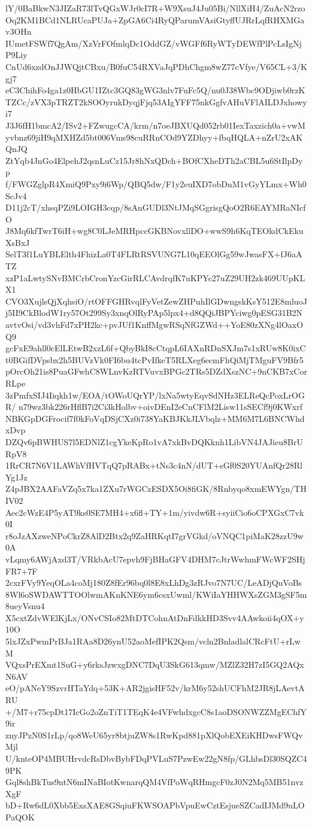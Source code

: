 lY/0BaBkwN3JIZaR73lTvQGxWJr0cI7R+W9XsuJ4Ju05Bi/NllXiH4/ZuAcN2rzo
Oq2KM1BCd1NLRUcaPUJa+ZpGA6Ci4RyQParumVAsiGtyffUJRrLqfRHXMGav3OHn
IUmetFSWf7QgAm/XzVrFOfmlqDc1OddGZ/vWGFf6RyWTyDEWfPlPcLsIgNjP9Liy
CnUd6xzdOnJJWQjtCBxu/B0fuC54RXVaJqPDhChgm8wZ77cVfye/V65CL+3/Kgj7
eC3ChihFo4ga1z0HbGU1IZtc3GQ83gWG3nlv7FuFc5Q/nu0J38Wbc9ODjiwb0rzK
TZCc/zVX3pTRZT2kSOOyrukDyqjFjq53AIgYFF75nkGgfvAHuVFlAILDJxhowyi7
J3J6fH1bmcA2/ISv2+FZwugcCA/krm/n7oeJBXUQd052rb01IexTaxzich0a+vwM
yvbnz69jiH9qMXHZd5bt006Vms98cuRRnCOd9YZDhyy+fbqHQLA+nZrU2xAKQnJQ
ZtYqb4JnGo4ElpehJ2qsnLuCz15Jr8hNxQDch+BOfCXheDTh2aCBL5u6StIlpDyp
f/FWGZglpR4XmiQ9Pxy9i6Wp/QBQ5dw/F1y2euIXD7obDnM1vGyYLmx+Wh0ScJv4
D11j2cT/xhsqPZi9LOIGH3cqp/8sAnGUDl3NtJMqSGgrisgQoO2R6EAYMRaNIcfO
J8Mq6kfTwrT6iH+wg8C0LJeMRHpccGKBNovxllDO+wwS9h6KqTEOkdCkEkuXsBxJ
SelT3f1LuYBLElth4FhizLa0T4FLRtRSVUNG7L10qEEOlGg59wJwasFX+fJ6aATZ
xzP1aLwtySNvBMCrbCronYzcGirRLCAvdrqfK7uKPYc27uZ29UH2zk469UUpKLX1
CVO3XujlsQjXqhsiO/rtOFFGHRvqlFyVetZewZHPuhIlGDwngskKsY512E8mluoJ
j5II9CkBlodW1ry57Ot299Sy3xnqOlRyPAp5lpx4+d8QQiJBPYciwg0pESG31B2N
avtvOsi/vd3vhFd7xPH2kc+pvJUf1KnffMgwRSqNfGZWd++YoE80zXNg4lOaxOQ9
gcFxE9ahll0cElLEtwB2xzL6f+QbyBkI8cCtqpL6IAXnRDnSXJm7s1xRUw8K0ixC
t0BGifDVpsbx2h5BUVzVk0FI6bu4tcPvIfkeT5RLXeg6ecmFhQiMjTMguFV9Bfr5
pOrcOh21is8PuaGFwhC8WLnvKzRTVuvxBPGc2TRs5DZdXszNC+9nCKB7xCorRLpe
3zPmfxSIJ4Iiqkh1w/EOA/tOWoUQrYP/lxNa5wtyEqvSdNHz3ELReQcPoxLrOGR/
n79wz3bk226rHflB7i2Ci3kHolbv+oivDEnI2eCnCFlM2Lisw11sSECf9j0KWxrf
NBKGpDGFrocif7f0kFoVqDSjCXz0i738YaKBJKkJLVbqlz+MM6M7L6BNCWhdxDvp
DZQv6pBWHUS7l5EDNlZ1cgYkeKpRo1vA7xkBvDQKknh1LibVN4JAJieu8BrURpV8
1RrCR7N6V1LAWhVfHVTqQ7pRABx+tNs3c4nN/dUT+sGf0S20YUAnfQr28RlYg1Jz
Z4pJBX2AAFaVZq5x7ka1ZXu7rWGCzESDX5Oi8fiGK/8Rnbyqo8xmEWYgn/THIV02
Aec2cWzE4P5yAT9ks0SE7MH4+x6fl+TY+1m/yivdw6R+syiiCio6oCPXGxC7vk0I
r8oJzAXzweNPoCkrZ8AlD2Btx2q9ZaHRKqtI7grVGkd/oVNQC1piMaK28zzU9w0A
vLqmy6AWjAxd3T/VRkbAcU7epvh9FjBHaGFV4DHM7cJtrWwhmFWcWF2SHjFR7+7F
2cxrFVy9YeqOLa4coMj180Z8fEr96bq0l8E8xLhDg3zRJvo7N7UC/LeADjQuVoBs
8Wl6oSWDAWTTOOlwmAKnKNE6ym6csxUwml/KWiIaYHHWXsZGM3gSF5m8ueyVsnu4
X5cxtZdvWElKjLx/ONvCSIo82MtDTCohnAtDnFdkkHD3Svv4AAwkoii4qOX+y10O
5lxJZxPwmPrBJa1RAa8D26ynU52aoMefIPK2Qsm/vcln2BnladlalCRcFtU+rLwM
VQxsPrEXmt1SuG+y6rksJzwxgDNC7DqU3SkG613qmw/MZlZ32H7zI5GQ2AQxN6AV
eO/pANeY9SzvrHTaYdq+53K+AR2jgisHF52v/krM6y52shUCFhM2JR8jLAevtARU
+/M7+r75cpDt17IcGo2oZnTiT1TEqK4e4VFwhdxgcC8s1aoDSONWZZMgEChfY9ir
znyJPzN0S1rLp/qo8WeU65yr8btjuZW8s1RwKpd881pXlQobEXEiKHDwsFWQvMjl
U/knteOP4MBUHrvdcRsDbvBybFDqPVLuS7PzwEw22gN8fp/GLhbsDl30SQZC49PK
Gql8shBkTus9ntN6mINaBIotKwnarqQM4VfPoWqRHmgcF0zJ0N2Mq5MB51nvzXgF
bD+Rw6dL0Xbb5ExsXAE8GSqiuFKWSOAPbVpuEwCztEsjueSZCadIJMd9uLOPaQOK
